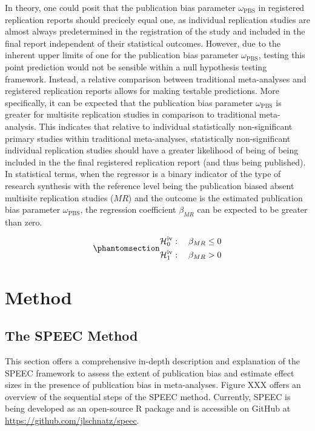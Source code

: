 \documentclass[
  12pt,
]{scrartcl}
\newcommand{\pbs}{\omega_{\text{PBS}}}
\newcommand{\hypothesis}[2]{\mathcal{H}^{\text{#1}}_{\text{#2}}}
\begin{document}
In theory, one could posit that the publication bias parameter \(\pbs\)
in registered replication reports should precicely equal one, as
individual replication studies are almost always predetermined in the
registration of the study and included in the final report independent
of their statistical outcomes. However, due to the inherent upper limits
of one for the publication bias parameter \(\pbs\), testing this point
prediction would not be sensible within a null hypothesis testing
framework. Instead, a relative comparison between traditional
meta-analyses and registered replication reports allows for making
testable predictions. More specifically, it can be expected that the
publication bias parameter \(\pbs\) is greater for multisite replication
studies in comparison to traditional meta-analysis. This indicates that
relative to individual statistically non-significant primary studies
within traditional meta-analyses, statistically non-significant
individual replication studies should have a greater likelihood of being
of being included in the the final registered replication report (and
thus being published). In statistical terms, when the regressor is a
binary indicator of the type of research synthesis with the reference
level being the publication biased absent multisite replication studies
(\(MR\)) and the outcome is the estimated publication bias parameter
\(\pbs\), the regression coefficient \(\beta_{MR}\) can be expected to
be greater than zero.

\begin{equation}\phantomsection\label{eq-h4}{
\begin{gathered}
\hypothesis{iv}{0}: \quad \beta_{MR} \leq 0 \\
\hypothesis{iv}{1}: \quad \beta_{MR} > 0
\end{gathered}
}\end{equation}

\newpage

\section{Method}\label{method}

\subsection{The SPEEC Method}\label{the-speec-method}

This section offers a comprehensive in-depth description and explanation
of the SPEEC framework to assess the extent of publication bias and
estimate effect sizes in the presence of publication bias in
meta-analyses. Figure XXX offers an overview of the sequential steps of
the SPEEC method. Currently, SPEEC is being developed as an open-source
R package and is accessible on GitHub at
\url{https://github.com/jlschnatz/speec}.
\end{document}
